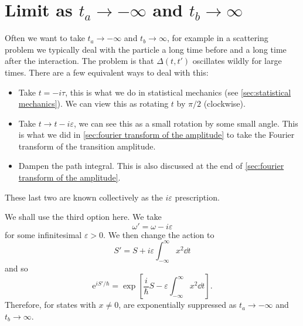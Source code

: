 \documentclass[fleqn]{NotesClass}
\newcommand*{\e}{\mathrm{e}}
\begin{document}
    \section{Limit as \(t_a \to -\infty\) and \(t_b \to \infty\)}
    Often we want to take \(t_a \to -\infty\) and \(t_b \to \infty\), for example in a scattering problem we typically deal with the particle a long time before and a long time after the interaction.
    The problem is that \(\Delta(t, t')\) oscillates wildly for large times.
    There are a few equivalent ways to deal with this:
    \begin{itemize}
        \item Take \(t = -i\tau\), this is what we do in statistical mechanics (see \cref{sec:statistical mechanics}).
        We can view this as rotating \(t\) by \(\pi/2\) (clockwise).
        \item Take \(t \to t - i\varepsilon\), we can see this as a small rotation by some small angle.
        This is what we did in \cref{sec:fourier transform of the amplitude} to take the Fourier transform of the transition amplitude.
        \item Dampen the path integral.
        This is also discussed at the end of \cref{sec:fourier transform of the amplitude}.
    \end{itemize}
    These last two are known collectively as the \(i\varepsilon\) prescription.
    
    We shall use the third option here.
    We take
    \begin{equation}
        \omega' = \omega - i\varepsilon
    \end{equation}
    for some infinitesimal \(\varepsilon > 0\).
    We then change the action to
    \begin{equation}
        S' = S + i\varepsilon \int_{-\infty}^{\infty} x^2 \dd{t}
    \end{equation}
    and so
    \begin{equation}
        \e^{iS'/\hbar} = \exp\left[ \frac{i}{\hbar} S - \varepsilon\int_{-\infty}^{\infty} x^2 \dd{t} \right].
    \end{equation}
    Therefore, for states with \(x \ne 0\), are exponentially suppressed as \(t_a \to -\infty\) and \(t_b \to \infty\).
    
\end{document}

